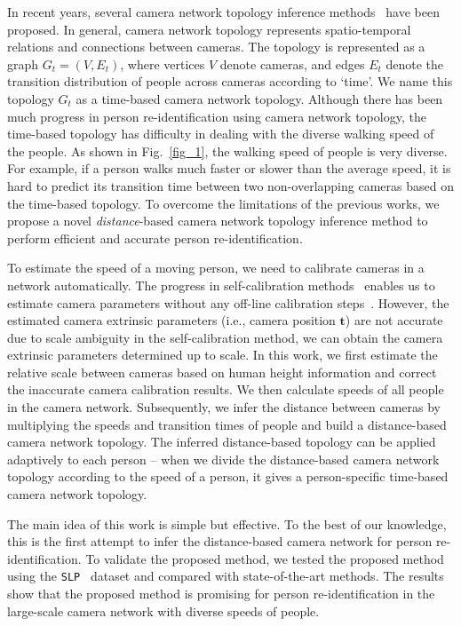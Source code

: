 \documentclass[10pt,twocolumn,letterpaper]{article}
\begin{document}
	In recent years, several camera network topology inference methods~\cite{makris2004bridging, stauffer2005learning, chen2014object} have been proposed.
	In general, camera network topology represents spatio-temporal relations and connections between cameras. 
	The topology is represented as a graph $G_t = (V,E_t)$, where vertices $V$ denote cameras, and edges $E_t$ denote the transition distribution of people across cameras according to `time'. We name this topology $G_{t}$ as a time-based camera network topology.
	Although there has been much progress in person re-identification using camera network topology, the time-based topology has difficulty in dealing with the diverse walking speed of the people.
	As shown in Fig.~\ref{fig_1}, the walking speed of people is very diverse. For example, if a person walks much faster or slower than the average speed, it is hard to predict its transition time between two non-overlapping cameras based on the time-based topology. 	
	To overcome the limitations of the previous works, we propose a novel \emph{distance}-based camera network topology inference method to perform efficient and accurate person re-identification.
	
	To estimate the speed of a moving person, we need to calibrate cameras in a network automatically. 
	The progress in self-calibration methods~\cite{lv2006camera, liu2011surveillance} enables us to estimate camera parameters without any off-line calibration steps~\cite{zhang1999flexible}.	However, the estimated camera extrinsic parameters (i.e., camera position $\mathbf{t}$) are not accurate due to scale ambiguity in the self-calibration method, \ie we can obtain the camera extrinsic parameters determined up to scale. 
	In this work, we first estimate the relative scale between cameras based on human height information and correct the inaccurate camera calibration results.
	We then calculate speeds of all people in the camera network.  
	Subsequently, we infer the distance between cameras by multiplying the speeds and transition times of people and build a distance-based camera network topology.
	The inferred distance-based topology can be applied adaptively to each person -- when we divide the distance-based camera network topology according to the speed of a person, it gives a person-specific time-based camera network topology.
	
	The main idea of this work is simple but effective. To the best of our knowledge, this is the first attempt to infer the distance-based camera network for person re-identification.
	To validate the proposed method, we tested the proposed method using the \texttt{SLP}~\cite{Cho_2017_ICCV_Workshops} dataset and compared with state-of-the-art methods. The results show that the proposed method is promising for person re-identification in the large-scale camera network with diverse speeds of people.
	
\end{document}
